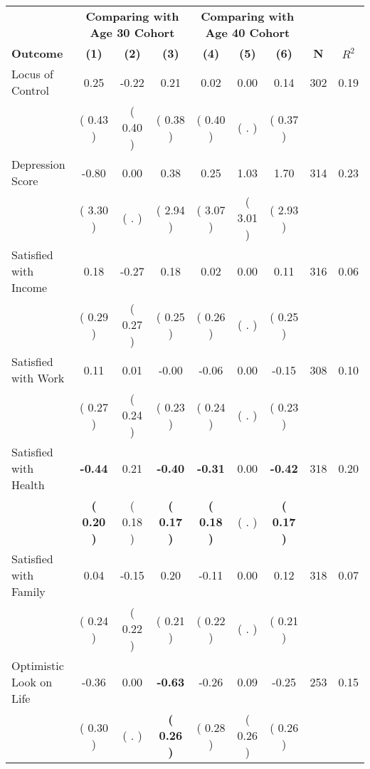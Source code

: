 \begin{tabular}{lcccccccc}
\toprule
 & \multicolumn{3}{c}{\textbf{Comparing with Age 30 Cohort}} & \multicolumn{3}{c}{\textbf{Comparing with Age 40 Cohort}} & \\
\cmidrule(lr){2-4} \cmidrule(lr){5-7} 
 \textbf{Outcome} & \textbf{(1)} & \textbf{(2)} & \textbf{(3)} & \textbf{(4)} & \textbf{(5)} & \textbf{(6)} & \textbf{N} & \textbf{$ R^2$} \\
\midrule
Locus of Control &      0.25 &     -0.22 &      0.21 &      0.02 &      0.00 &      0.14 & 302 &       0.19 \\ 
 & (     0.43 ) & (     0.40 ) & (     0.38 ) & (     0.40 ) & (        . ) & (     0.37 ) & \\
Depression Score &     -0.80 &      0.00 &      0.38 &      0.25 &      1.03 &      1.70 & 314 &       0.23 \\ 
 & (     3.30 ) & (        . ) & (     2.94 ) & (     3.07 ) & (     3.01 ) & (     2.93 ) & \\
Satisfied with Income &      0.18 &     -0.27 &      0.18 &      0.02 &      0.00 &      0.11 & 316 &       0.06 \\ 
 & (     0.29 ) & (     0.27 ) & (     0.25 ) & (     0.26 ) & (        . ) & (     0.25 ) & \\
Satisfied with Work &      0.11 &      0.01 &     -0.00 &     -0.06 &      0.00 &     -0.15 & 308 &       0.10 \\ 
 & (     0.27 ) & (     0.24 ) & (     0.23 ) & (     0.24 ) & (        . ) & (     0.23 ) & \\
Satisfied with Health & \textbf{    -0.44} &      0.21 & \textbf{    -0.40} & \textbf{    -0.31} &      0.00 & \textbf{    -0.42} & 318 &       0.20 \\ 
 & \textbf{(     0.20 )} & (     0.18 ) & \textbf{(     0.17 )} & \textbf{(     0.18 )} & (        . ) & \textbf{(     0.17 )} & \\
Satisfied with Family &      0.04 &     -0.15 &      0.20 &     -0.11 &      0.00 &      0.12 & 318 &       0.07 \\ 
 & (     0.24 ) & (     0.22 ) & (     0.21 ) & (     0.22 ) & (        . ) & (     0.21 ) & \\
Optimistic Look on Life &     -0.36 &      0.00 & \textbf{    -0.63} &     -0.26 &      0.09 &     -0.25 & 253 &       0.15 \\ 
 & (     0.30 ) & (        . ) & \textbf{(     0.26 )} & (     0.28 ) & (     0.26 ) & (     0.26 ) & \\

\end{tabular}
